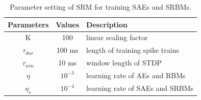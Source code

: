 \begin{table}[hbbp]
	\centering
	\caption{\label{tbl:srm}Parameter setting of SRM for training SAEs and SRBMs.}
	\bgroup
	\def\arraystretch{1.4}
	\begin{tabular}{c c l}
		Parameters & Values & Description \\
		\hline
		K & 100 & linear scaling factor\\
		$\tau_{dur}$ & 100 ms &  length of training spike trains\\
		$\tau_{win}$ & 10 ms & window length of STDP\\
		$\eta$ & $10^{-3}$ & learning rate of AEs and RBMs\\
		$\eta_s$ & $10^{-4}$ & learning rate of SAEs and SRBMs\\
	\end{tabular}
	\egroup
\end{table}



